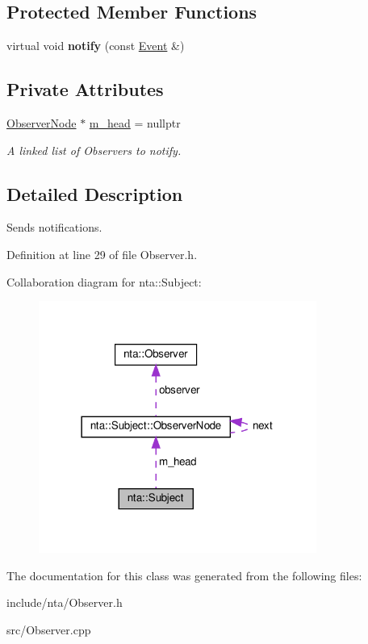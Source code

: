 \subsection*{Protected Member Functions}
\begin{DoxyCompactItemize}
\item 
\mbox{\label{classnta_1_1Subject_aefbbc64af07ff9f4a35870cf5b51ce03}} 
virtual void {\bfseries notify} (const \hyperlink{structnta_1_1Event}{Event} \&)
\end{DoxyCompactItemize}
\subsection*{Private Attributes}
\begin{DoxyCompactItemize}
\item 
\mbox{\label{classnta_1_1Subject_a7049999f4dcfbaa6ce6af23a98ff2027}} 
\hyperlink{structnta_1_1Subject_1_1ObserverNode}{Observer\+Node} $\ast$ \hyperlink{classnta_1_1Subject_a7049999f4dcfbaa6ce6af23a98ff2027}{m\+\_\+head} = nullptr
\begin{DoxyCompactList}\small\item\em A linked list of Observers to notify. \end{DoxyCompactList}\end{DoxyCompactItemize}


\subsection{Detailed Description}
Sends notifications. 

Definition at line 29 of file Observer.\+h.



Collaboration diagram for nta\+:\+:Subject\+:
\nopagebreak
\begin{figure}[H]
\begin{center}
\leavevmode
\includegraphics[width=258pt]{d5/d37/classnta_1_1Subject__coll__graph}
\end{center}
\end{figure}


The documentation for this class was generated from the following files\+:\begin{DoxyCompactItemize}
\item 
include/nta/Observer.\+h\item 
src/Observer.\+cpp\end{DoxyCompactItemize}
